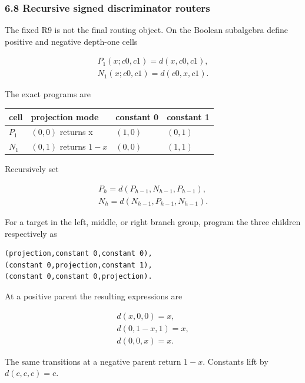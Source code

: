 \documentclass[
  11pt,
]{article}
\theoremstyle{definition}
\theoremstyle{remark}
\begin{document}
\hypertarget{recursive-signed-discriminator-routers}{%
\subsubsection{6.8 Recursive signed discriminator
routers}\label{recursive-signed-discriminator-routers}}

The fixed R9 is not the final routing object. On the Boolean subalgebra
define positive and negative depth-one cells

\[
\begin{aligned}
P_1(x;c0,c1)=d(x,c0,c1), \\
N_1(x;c0,c1)=d(c0,x,c1).
\end{aligned}
\]

The exact programs are

\begin{longtable}[]{@{}llll@{}}
\toprule\noalign{}
cell & projection mode & constant 0 & constant 1 \\
\midrule\noalign{}
\endhead
\bottomrule\noalign{}
\endlastfoot
\(P_1\) & \((0,0)\) returns x & \((1,0)\) & \((0,1)\) \\
\(N_1\) & \((0,1)\) returns \(1-x\) & \((0,0)\) & \((1,1)\) \\
\end{longtable}

Recursively set

\[
\begin{aligned}
P_h=d(P_{h-1},N_{h-1},P_{h-1}), \\
N_h=d(N_{h-1},P_{h-1},N_{h-1}).
\end{aligned}
\]

For a target in the left, middle, or right branch group, program the
three children respectively as

\begin{lstlisting}
(projection,constant 0,constant 0),
(constant 0,projection,constant 1),
(constant 0,constant 0,projection).
\end{lstlisting}

At a positive parent the resulting expressions are

\[
\begin{aligned}
d(x,0,0)=x, \\
d(0,1-x,1)=x, \\
d(0,0,x)=x.
\end{aligned}
\]

The same transitions at a negative parent return \(1-x\). Constants lift
by \(d(c,c,c)=c\).
\end{document}
